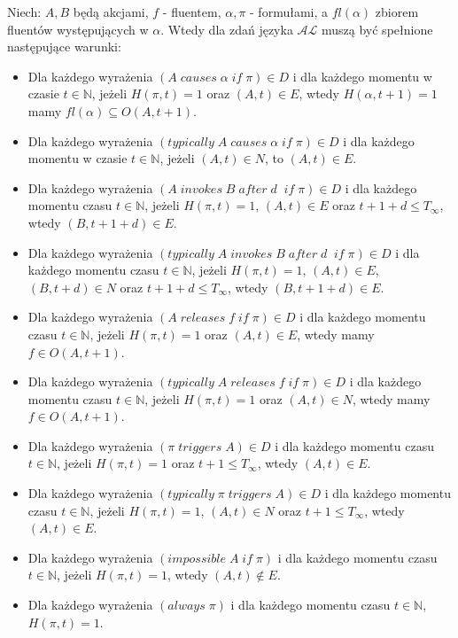 Niech: $A,B$ będą akcjami, $ f $ - fluentem, $\alpha, \pi$ - formułami, a $fl(\alpha)$ zbiorem fluentów występujących w $\alpha$. Wtedy dla zdań języka $\mathcal{AL}$  muszą być spełnione następujące warunki: 
   \begin{itemize} 
   		\item Dla każdego wyrażenia $ ( A\;causes\;\alpha\;if\;\pi)\in D $ i dla każdego momentu w czasie $t \in \mathbb{N}$, jeżeli $H(\pi,t)=1$ oraz $(A,t) \in E$, wtedy $H(\alpha,t + 1)=1$ mamy $fl(\alpha)\subseteq O(A,t + 1)$.
		\item Dla każdego wyrażenia $ ( typically\; A\;causes\;\alpha\;if\;\pi)\in D $ i dla każdego momentu w czasie $t \in \mathbb{N}$, jeżeli $(A,t) \in N$, to $(A,t) \in E$.
 		\item Dla każdego wyrażenia $( A\;invokes\;B\;after\;d\;\;if\;\pi)\in D$ i dla każdego momentu czasu $t \in \mathbb{N}$, jeżeli $H(\pi,t)=1$, $(A,t)\in E $ oraz $t+1+d\leq T_{\infty}$, wtedy $(B,t+1+d) \in E $.
	 	\item Dla każdego wyrażenia $( typically\; A\;invokes\;B\;after\;d\;\;if\;\pi)\in D$ i dla każdego momentu czasu $t \in \mathbb{N}$, jeżeli $H(\pi,t)=1$, $(A,t)\in E$, $(B, t + d)\in N $ oraz $t+1+d\leq T_{\infty}$, wtedy $(B,t+1+d) \in E $.
   		\item Dla każdego wyrażenia $( A \;releases\;f\;if\;\pi)\in D $ i dla każdego momentu czasu $t \in \mathbb{N}$, jeżeli $H(\pi,t)=1$ oraz $(A,t)\in E$, wtedy mamy $f\in O(A,t+1)$.
 		\item Dla każdego wyrażenia $( typically\; A \;releases\;f\;if\;\pi)\in D $ i dla każdego momentu czasu $t \in \mathbb{N}$, jeżeli $H(\pi,t)=1$ oraz $(A,t)\in N$, wtedy mamy $f\in O(A,t+1)$.
   		\item Dla każdego wyrażenia $(\pi\;triggers\; A)\in D$ i dla każdego momentu czasu $t \in \mathbb{N}$, jeżeli $H(\pi,t)=1$ oraz $t+1\leq T_{\infty}$, wtedy $(A,t)\in E$.
		\item Dla każdego wyrażenia $(typically\; \pi\;triggers\; A)\in D$ i dla każdego momentu czasu $t \in \mathbb{N}$, jeżeli $H(\pi,t)=1$, $(A, t)\in N$ oraz $t+1\leq T_{\infty}$, wtedy $(A,t)\in E$.
		\item Dla każdego wyrażenia $(impossible \; A \; if\;  \pi )$ i dla każdego momentu czasu $t \in \mathbb{N}$, jeżeli $H(\pi,t)=1$, wtedy $(A,t) \notin E $.
		\item Dla każdego wyrażenia $(always \; \pi )$ i dla każdego momentu czasu $t \in \mathbb{N}$, $H(\pi,t)=1$.
   \end{itemize}
